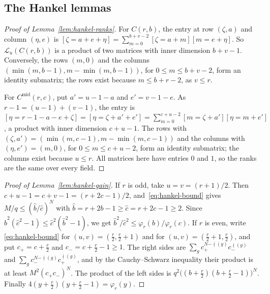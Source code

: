 \subsection{The Hankel lemmas}
\label{subsec:proof-hankel}

\begin{proof}[Proof of Lemma~\ref{lem:hankel-ranks}]
For \(C(r,b)\), the entry at row \((\zeta,a)\) and column \((\eta,e)\)
is \([\zeta=a+e+\eta]=\sum_{m=0}^{b+v-2}[\zeta=a+m][m=e+\eta]\).
So \(\mathcal L_u(C(r,b))\) is a product of two matrices with inner
dimension \(b+v-1\). Conversely, the rows \((m,0)\) and the columns
\((\min(m,b-1),m-\min(m,b-1))\), for \(0\le m\le b+v-2\), form an
identity submatrix; the rows exist because \(m\le b+r-2\), as
\(v\le r\).

For \(C^{\mathrm{mid}}(r,c)\), put \(a'=u-1-a\) and \(e'=v-1-e\). As
\(r-1=(u-1)+(v-1)\), the entry is
\([\eta=r-1-a-e+\zeta]=[\eta=\zeta+a'+e']
=\sum_{m=0}^{c+u-2}[m=\zeta+a'][\eta=m+e']\), a product
with inner dimension \(c+u-1\). The rows with
\((\zeta,a')=(\min(m,c-1),m-\min(m,c-1))\) and the columns
with \((\eta,e')=(m,0)\), for \(0\le m\le c+u-2\), form an
identity submatrix; the columns exist because \(u\le r\). All matrices
here have entries \(0\) and \(1\), so the ranks are the same over every
field.
\end{proof}

\begin{proof}[Proof of Lemma~\ref{lem:hankel-gain}]
If \(r\) is odd, take \(u=v=(r+1)/2\). Then
\(c+u-1=c+v-1=(r+2c-1)/2\), and~\eqref{eq:hankel-bound} gives
\(M/q\le(\hat b/\hat c)^N\) with \(\hat b=r+2b-1\ge\hat c=r+2c-1\ge2\).
Since \(\hat b^2(\hat c^2-1)\le\hat c^2(\hat b^2-1)\), we get
\(\hat b^2/\hat c^2\le\varphi_r(b)/\varphi_r(c)\). If \(r\) is even, write
\eqref{eq:hankel-bound} for \((u,v)=(\frac r2,\frac r2+1)\) and for
\((u,v)=(\frac r2+1,\frac r2)\), and put \(c_+=c+\frac r2\) and
\(c_-=c+\frac r2-1\ge1\). The right sides are
\(\sum_gc_+^{N-\nmid(g)}c_-^{\nmid(g)}\) and
\(\sum_gc_-^{N-\nmid(g)}c_+^{\nmid(g)}\), and by the
Cauchy--Schwarz inequality their product is at least
\(M^2(c_+c_-)^N\). The product of the left sides is
\(q^2\bigl((b+\frac r2)(b+\frac r2-1)\bigr)^N\). Finally
\(4(y+\frac r2)(y+\frac r2-1)=\varphi_r(y)\).
\end{proof}

